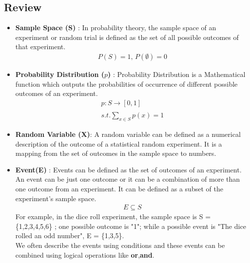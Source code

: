 \documentclass[12pt]{article}
\begin{document}
\subsection{Review}
\begin{itemize}
    \item \textbf{Sample Space (S)} : In probability theory, the sample space of an experiment or random trial is defined as the set of all possible outcomes of that experiment.
    \begin{gather*}
        P(S)=1 ,\hspace{2pt} P(\emptyset)=0
    \end{gather*}


    \item \textbf{Probability Distribution ($p$)} : Probability Distribution is a Mathematical function which outputs the probabilities of occurrence of different possible outcomes of an experiment.
    \begin{gather*}
        p:S\xrightarrow[]{}[0,1]  \\
        s.t.  \sum_{x\in S} p(x) = 1 
    \end{gather*}
    
    \item \textbf{Random Variable (X)}: A random variable can be defined as a numerical description of the outcome of a statistical random experiment. It is a mapping from the set of outcomes in the sample space to numbers.

    \item \textbf{Event(E)} :
    Events can be defined as the set of outcomes of an experiment. An event can be just one outcome or it can be a combination of more than one outcome from an experiment. 
    It can be defined as a subset of the experiment's sample space.
    \begin{gather*}
        E\subseteq S
    \end{gather*}
    For example, in the dice roll experiment, the sample space is S = \{1,2,3,4,5,6\} ; one possible outcome is "1"; while a possible event is "The dice rolled an odd number", E = \{1,3,5\}. \\
    We often describe the events using conditions and these events can be combined using logical operations like \textbf{or},\textbf{and}.


\end{itemize}
\end{document}
